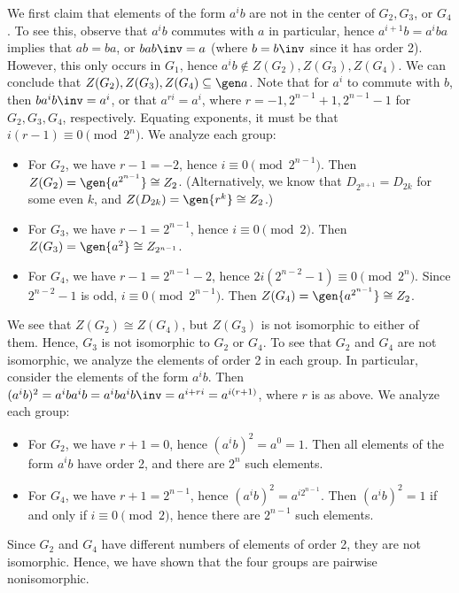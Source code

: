\begin{sol}
    We first claim that elements of the form $a^ib$ are not in the center of $G_2, G_3$, or $G_4$.
	To see this, observe that $a^ib$ commutes with $a$ in particular, hence $a^{i + 1}b = a^iba$ implies that $ab = ba$, or $bab\inv = a$ (where $b = b\inv$ since it has order 2).
	However, this only occurs in $G_1$, hence $a^ib \notin Z(G_2), Z(G_3), Z(G_4)$.
	We can conclude that $Z(G_2), Z(G_3), Z(G_4) \subseteq \gen a$.
	Note that for $a^i$ to commute with $b$, then $ba^ib\inv = a^i$, or that $a^{ri} = a^i$, where $r = -1, 2^{n - 1} + 1, 2^{n - 1} - 1$ for $G_2, G_3, G_4$, respectively.
	Equating exponents, it must be that $i(r - 1) \equiv 0 \pmod 2^n$.
	We analyze each group:
    \begin{itemize}
        \item For $G_2$, we have $r - 1 = -2$, hence $i \equiv 0 \pmod 2^{n - 1}$.
	Then $Z(G_2) = \gen{a^{2^{n - 1}}} \cong Z_2$. (Alternatively, we know that $D_{2^{n + 1}} = D_{2k}$ for some even $k$, and $Z(D_{2k}) = \gen{r^k} \cong Z_2$.)
        \item For $G_3$, we have $r - 1 = 2^{n - 1}$, hence $i \equiv 0 \pmod 2$.
	Then $Z(G_3) = \gen{a^2} \cong Z_{2^{n - 1}}$.
        \item For $G_4$, we have $r - 1 = 2^{n - 1} - 2$, hence $2i(2^{n - 2} - 1) \equiv 0 \pmod 2^n$.
	Since $2^{n - 2} - 1$ is odd, $i \equiv 0 \pmod 2^{n - 1}$.
	Then $Z(G_4) = \gen{a^{2^{n - 1}}} \cong Z_2$.
    \end{itemize}
    We see that $Z(G_2) \cong Z(G_4)$, but $Z(G_3)$ is not isomorphic to either of them.
	Hence, $G_3$ is not isomorphic to $G_2$ or $G_4$.
	To see that $G_2$ and $G_4$ are not isomorphic, we analyze the elements of order 2 in each group.
	In particular, consider the elements of the form $a^ib$.
	Then $(a^ib)^2 = a^iba^ib = a^iba^ib\inv = a^{i + ri} = a^{i(r + 1)}$, where $r$ is as above.
	We analyze each group:
    \begin{itemize}
        \item For $G_2$, we have $r + 1 = 0$, hence $(a^ib)^2 = a^0 = 1$.
	Then all elements of the form $a^ib$ have order 2, and there are $2^n$ such elements.
        \item For $G_4$, we have $r + 1 = 2^{n - 1}$, hence $(a^ib)^2 = a^{i2^{n - 1}}$.
	Then $(a^ib)^2 = 1$ if and only if $i \equiv 0 \pmod 2$, hence there are $2^{n - 1}$ such elements.
    \end{itemize}
    Since $G_2$ and $G_4$ have different numbers of elements of order 2, they are not isomorphic.
	Hence, we have shown that the four groups are pairwise nonisomorphic.
\end{sol}

